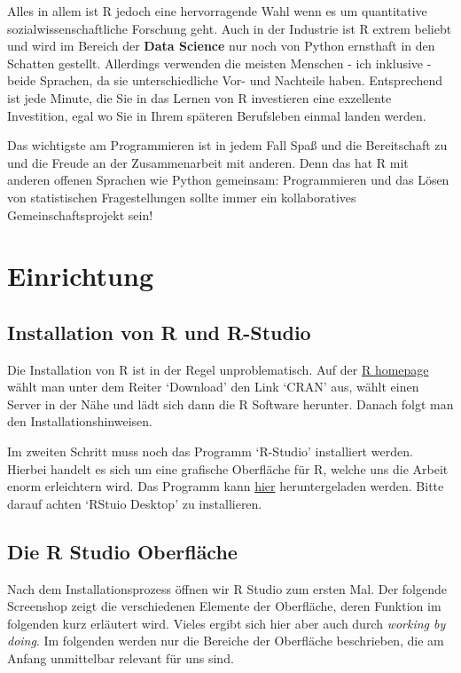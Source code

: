 \documentclass[]{tufte-book}
\begin{document}
Alles in allem ist R jedoch eine hervorragende Wahl wenn es um
quantitative sozialwissenschaftliche Forschung geht. Auch in der
Industrie ist R extrem beliebt und wird im Bereich der \textbf{Data
Science} nur noch von Python ernsthaft in den Schatten gestellt.
Allerdings verwenden die meisten Menschen - ich inklusive - beide
Sprachen, da sie unterschiedliche Vor- und Nachteile haben. Entsprechend
ist jede Minute, die Sie in das Lernen von R investieren eine exzellente
Investition, egal wo Sie in Ihrem späteren Berufsleben einmal landen
werden.

Das wichtigste am Programmieren ist in jedem Fall Spaß und die
Bereitschaft zu und die Freude an der Zusammenarbeit mit anderen. Denn
das hat R mit anderen offenen Sprachen wie Python gemeinsam:
Programmieren und das Lösen von statistischen Fragestellungen sollte
immer ein kollaboratives Gemeinschaftsprojekt sein!

\chapter{Einrichtung}\label{einrichtung}

\section{Installation von R und
R-Studio}\label{installation-von-r-und-r-studio}

Die Installation von R ist in der Regel unproblematisch. Auf der
\href{https://www.r-project.org/}{R homepage} wählt man unter dem Reiter
`Download' den Link `CRAN' aus, wählt einen Server in der Nähe und lädt
sich dann die R Software herunter. Danach folgt man den
Installationshinweisen.

Im zweiten Schritt muss noch das Programm `R-Studio' installiert werden.
Hierbei handelt es sich um eine grafische Oberfläche für R, welche uns
die Arbeit enorm erleichtern wird. Das Programm kann
\href{https://www.rstudio.com/products/rstudio/download/}{hier}
heruntergeladen werden. Bitte darauf achten `RStuio Desktop' zu
installieren.

\section{Die R Studio Oberfläche}\label{die-r-studio-oberflache}

Nach dem Installationsprozess öffnen wir R Studio zum ersten Mal. Der
folgende Screenshop zeigt die verschiedenen Elemente der Oberfläche,
deren Funktion im folgenden kurz erläutert wird. Vieles ergibt sich hier
aber auch durch \emph{working by doing}. Im folgenden werden nur die
Bereiche der Oberfläche beschrieben, die am Anfang unmittelbar relevant
für uns sind.
\end{document}
